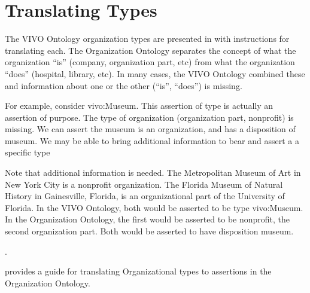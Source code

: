 \documentclass[letterpaper,10pt,english]{sphinxmanual}
\begin{document}
\section{Translating Types}
\label{\detokenize{vivo-to-org:translating-types}}
\sphinxAtStartPar
The VIVO Ontology organization types are presented in {\hyperref[\detokenize{vivo-to-org:table-16}]{}} with instructions
for translating each.  The Organization Ontology separates the concept of
what the organization “is” (company, organization part, etc) from what the
organization “does” (hospital, library, etc).  In many cases, the VIVO Ontology
combined these and information about one or the other (“is”, “does”) is missing.

\sphinxAtStartPar
For example, consider vivo:Museum.  This assertion of type is actually an
assertion of purpose.  The type of organization (organization part, non\sphinxhyphen{}profit) is
missing.  We can assert the museum is an organization, and has a disposition of
museum.  We may be able to bring additional information to bear and assert a
a specific type %
\begin{footnote}[2]\sphinxAtStartFootnote
Note that additional information is needed.  The Metropolitan Museum of Art
in New York City is a non\sphinxhyphen{}profit organization.  The Florida Museum of Natural
History in Gainesville, Florida, is an organizational part of the University of
Florida.  In the VIVO
Ontology, both would be asserted to be type vivo:Museum.  In the Organization
Ontology, the first would be asserted to be non\sphinxhyphen{}profit, the second organization
part.  Both would be asserted to have disposition museum.
%
\end{footnote}.

\sphinxAtStartPar
{\hyperref[\detokenize{vivo-to-org:table-16}]{}} provides a guide for translating Organizational types to assertions
in the Organization Ontology.
\end{document}

